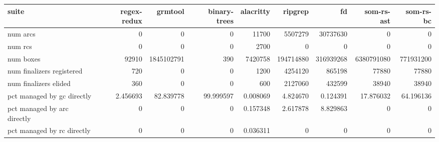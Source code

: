 \begin{tabular}{lrrrrrrrr}
\toprule
suite & regex-redux & grmtool & binary-trees & alacritty & ripgrep & fd & som-rs-ast & som-rs-bc \\
\midrule
num arcs & 0 & 0 & 0 & 11700 & 5507279 & 30737630 & 0 & 0 \\
num rcs & 0 & 0 & 0 & 2700 & 0 & 0 & 0 & 0 \\
num boxes & 92910 & 1845102791 & 390 & 7420758 & 194714880 & 316939268 & 6380791080 & 771931200 \\
num finalizers registered & 720 & 0 & 0 & 1200 & 4254120 & 865198 & 77880 & 77880 \\
num finalizers elided & 360 & 0 & 0 & 600 & 2127060 & 432599 & 38940 & 38940 \\
pct managed by gc directly & 2.456693 & 82.839778 & 99.999597 & 0.008069 & 4.824670 & 0.124391 & 17.876032 & 64.196136 \\
pct managed by arc directly & 0 & 0 & 0 & 0.157348 & 2.617878 & 8.829863 & 0 & 0 \\
pct managed by rc directly & 0 & 0 & 0 & 0.036311 & 0 & 0 & 0 & 0 \\
\bottomrule
\end{tabular}
